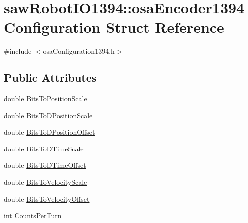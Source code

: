 \hypertarget{structsaw_robot_i_o1394_1_1osa_encoder1394_configuration}{\section{saw\-Robot\-I\-O1394\-:\-:osa\-Encoder1394\-Configuration Struct Reference}
\label{structsaw_robot_i_o1394_1_1osa_encoder1394_configuration}
}


{\ttfamily \#include $<$osa\-Configuration1394.\-h$>$}

\subsection*{Public Attributes}
\begin{DoxyCompactItemize}
\item 
double \hyperlink{structsaw_robot_i_o1394_1_1osa_encoder1394_configuration_a2c22c3f7cb7acdc7fbe6d5d51a814ef1}{Bits\-To\-Position\-Scale}
\item 
double \hyperlink{structsaw_robot_i_o1394_1_1osa_encoder1394_configuration_a3ae5e74c279903db875e33be6e2883aa}{Bits\-To\-D\-Position\-Scale}
\item 
double \hyperlink{structsaw_robot_i_o1394_1_1osa_encoder1394_configuration_a723c4a2ac007b9ac5384777f0721dfd7}{Bits\-To\-D\-Position\-Offset}
\item 
double \hyperlink{structsaw_robot_i_o1394_1_1osa_encoder1394_configuration_af81ac861e5e937302d9ff1cd7c588bd1}{Bits\-To\-D\-Time\-Scale}
\item 
double \hyperlink{structsaw_robot_i_o1394_1_1osa_encoder1394_configuration_a170dbb7e62ce29d27fc5b7b14f667ab5}{Bits\-To\-D\-Time\-Offset}
\item 
double \hyperlink{structsaw_robot_i_o1394_1_1osa_encoder1394_configuration_a746ed967a0547da052f09058b6c203ed}{Bits\-To\-Velocity\-Scale}
\item 
double \hyperlink{structsaw_robot_i_o1394_1_1osa_encoder1394_configuration_a63b455fc6fa30208293ab342efc83811}{Bits\-To\-Velocity\-Offset}
\item 
int \hyperlink{structsaw_robot_i_o1394_1_1osa_encoder1394_configuration_afd57b4ae73ec773c21015e4f7fbd33f9}{Counts\-Per\-Turn}
\end{DoxyCompactItemize}



